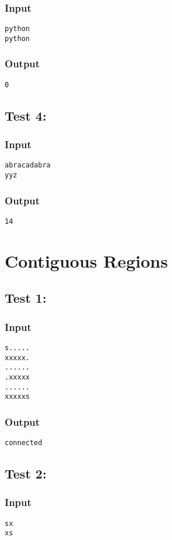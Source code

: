\documentclass[twocolumn]{extarticle}
\begin{document}
\subsubsection*{Input}
\texttt{python\\
python}

\subsubsection*{Output}
\texttt{0}

\subsection*{Test 4:}
\subsubsection*{Input}
\texttt{abracadabra\\
yyz}

\subsubsection*{Output}
\texttt{14}

\newpage
\section{Contiguous Regions}
\subsection*{Test 1:}
\subsubsection*{Input}
\texttt{s.....\\
xxxxx.\\
......\\
.xxxxx\\
......\\
xxxxxs}

\subsubsection*{Output}
\texttt{connected}

\subsection*{Test 2:}
\subsubsection*{Input}
\texttt{sx\\
xs}
\end{document}
